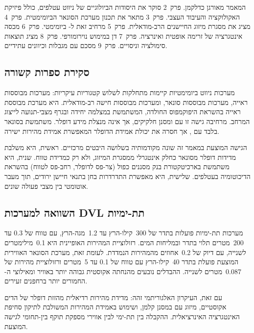 המאמר מאורגן כדלקמן. פרק~2 סוקר את היסודות הביולוגיים של ניווט עטלפים, כולל פיזיקת האקולוקציה והעיבוד העצבי. פרק~3 מתאר את תכנון מערכת הסונאר הביומימטית. פרק~4 מציג את מסגרת מיזוג החיישנים הרב-מודאלית. פרק~5 מרחיב זאת ל- ביומימטי. פרק~6 מכסה אינטגרציה של זרימה אופטית ואינרציה. פרק~7 דן במימוש נוירומורפי. פרק~8 מציג תוצאות סימולציה וניסויים. פרק~9 מסכם עם מגבלות וכיוונים עתידיים.

\subsection{סקירת ספרות קשורה}
\label{sec:related_work}

מערכות ניווט ביומימטיות קיימות מתחלקות לשלוש קטגוריות עיקריות: מערכות מבוססות ראייה, מערכות מבוססות סונאר, ומערכות מבוססות חישה רב-מודאלית.  היא מערכת  מבוססת ראייה בהשראת היפוקמפוס החולדה, המשתמשת במצלמה יחידה ובגרף מצבי-תנועה לייצוג המרחב.  מרחיבה גישה זו עם  ומסנן חלקיקים, אך אינה מנצלת מידע דופלר.  משתמשת בסונאר בלבד עם , אך חסרה את יכולת אמידת הדופלר המאפשרת אמידת מהירות ישירה.

הגישה המוצעת במאמר זה שונה מקודמותיה בשלושה היבטים מרכזיים. ראשית, היא משלבת מדידות דופלר מסונאר כחלק אינטגרלי ממסגרת המיזוג, ולא רק כמדידת טווח. שנית, היא משתמשת בארכיטקטורת בנק מסננים כפול (צר-פס לדופלר, רחב-פס לטווח) בהשראת הדיכוטומיה  בעטלפים. שלישית, היא מאפשרת התדרדרות בחן בתנאי חיישן ירודים, תוך מעבר אוטומטי בין מצבי פעולה שונים.

\subsection{השוואה למערכות DVL תת-ימיות}
\label{sec:dvl_comparison}

מערכות  תת-ימיות פועלות בתדר של 300~קילו-הרץ עד 1.2~מגה-הרץ, עם טווח של 0.3 עד 200~מטרים תלוי בתדר ובמליחות המים. רזולוציית המהירות האופיינית היא 0.1~מילימטרים לשנייה, עם דיוק של 0.2~אחוזים מהמהירות הנמדדת. לעומת זאת, מערכת הסונאר האווירית המוצעת פועלת בתדר 40~קילו-הרץ עם טווח של 0.1 עד 5~מטרים ורזולוציית מהירות של 0.087~מטרים לשנייה. ההבדלים נובעים מהנחתה אקוסטית גבוהה יותר באוויר ומאילוצי ה- החמורים יותר ברחפנים זעירים.

עם זאת, העיקרון האלגוריתמי זהה: מדידת מהירות רדיאלית מהזזת דופלר של הדים אקוסטיים, מיזוג עם  במסנן קלמן, ושימוש באמידת המהירות המשולבת לתיקון סחיפת האינטגרציה האינרציאלית. ההקבלה בין  תת-ימי לבין  אווירי מספקת תוקף בין-תחומי לגישה המוצעת.

